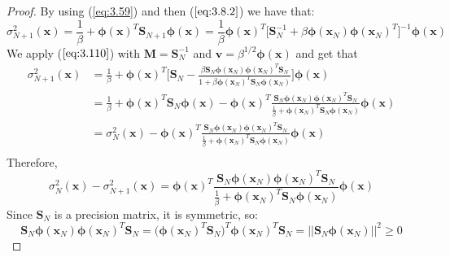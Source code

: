 \begin{proof}
    By using (\ref{eq:3.59}) and then ($\ref{eq:3.8.2}$) we have that:
     \[
         \sigma_{N + 1}^2(\mathbf{x})
         = \frac{1}{\beta} + \bm{\phi}(\mathbf{x})^T\mathbf{S}_{N + 1}\bm{\phi}(\mathbf{x})
         = \frac{1}{\beta} \bm{\phi}(\mathbf{x})^T
         \bigg[\mathbf{S}_N^{-1} + \beta \bm{\phi}(\mathbf{x}_N)\bm{\phi}(\mathbf{x}_N)^T\bigg]^{-1}
                \bm{\phi}(\mathbf{x})
    \] 
    We apply ($\ref{eq:3.110}$) with $\mathbf{M} = \mathbf{S}_N^{-1}$ 
    and $\mathbf{v} = \beta^{1/2}\bm{\phi}(\mathbf{x})$ and get that
    \begin{align*}
        \sigma^{2}_{N + 1}(\mathbf{x})
        &= \frac{1}{\beta} + \bm{\phi}(\mathbf{x})^T
            \bigg[\mathbf{S}_N 
            - \frac{\beta\mathbf{S}_N\bm{\phi}(\mathbf{x}_N)\bm{\phi}(\mathbf{x}_N)^T\mathbf{S}_N}
            {1 + \beta \bm{\phi}(\mathbf{x}_N)^T\mathbf{S}_N\bm{\phi}(\mathbf{x}_N)}\bigg]
        \bm{\phi}(\mathbf{x}) \\
        &= \frac{1}{\beta} + \bm{\phi}(\mathbf{x})^T\mathbf{S}_N\bm{\phi}(\mathbf{x})
            - \bm{\phi}(\mathbf{x})^T\frac{\mathbf{S}_N\bm{\phi}
            (\mathbf{x}_N)\bm{\phi}(\mathbf{x}_N)^T\mathbf{S}_N}
            {\frac{1}{\beta} + \bm{\phi}(\mathbf{x}_N)^T\mathbf{S}_N\bm{\phi}(\mathbf{x}_N)}
            \bm{\phi}(\mathbf{x}) \\
        &= \sigma_{N}^2(\mathbf{x})
            - \bm{\phi}(\mathbf{x})^T
            \frac{\mathbf{S}_N\bm{\phi}(\mathbf{x}_N)\bm{\phi}(\mathbf{x}_N)^T\mathbf{S}_N}
            {\frac{1}{\beta} + \bm{\phi}(\mathbf{x}_N)^T\mathbf{S}_N\bm{\phi}(\mathbf{x}_N)}
            \bm{\phi}(\mathbf{x}) \\
    \end{align*}
    Therefore,
    \begin{equation*}
        \sigma_N^2(\mathbf{x}) - \sigma_{N + 1}^2(\mathbf{x})
        = \bm{\phi}(\mathbf{x})^T
            \frac{\mathbf{S}_N\bm{\phi}(\mathbf{x}_N)\bm{\phi}(\mathbf{x}_N)^T\mathbf{S}_N}
            {\frac{1}{\beta} + \bm{\phi}(\mathbf{x}_N)^T\mathbf{S}_N\bm{\phi}(\mathbf{x}_N)}
            \bm{\phi}(\mathbf{x})
        \tag{3.11.1}\label{eq:3.11.1}
    \end{equation*}
    Since $\mathbf{S}_N$ is a precision matrix, it is symmetric, so:
    \[
        \mathbf{S}_N\bm{\phi}(\mathbf{x}_N)\bm{\phi}(\mathbf{x}_N)^T\mathbf{S}_N
        = \big(\bm{\phi}(\mathbf{x}_N)^T\mathbf{S}_N\big)^T\bm{\phi}(\mathbf{x}_N)^T\mathbf{S}_N
        = ||\mathbf{S}_N \bm{\phi}(\mathbf{x}_N)||^2 \geq 0
\]
\end{proof}
